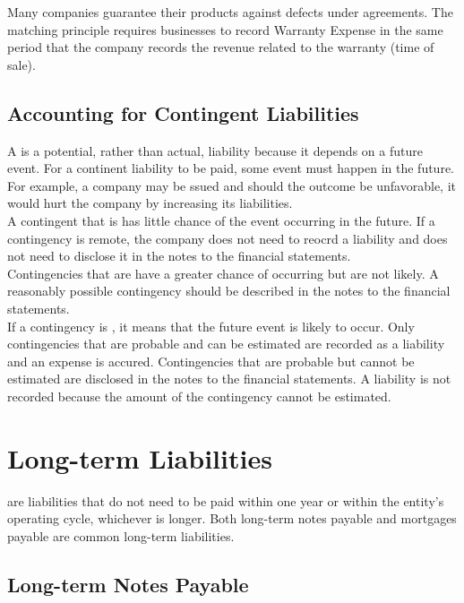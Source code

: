 \documentclass{article}
\begin{document}
Many companies guarantee their products against defects under  agreements. The matching principle requires businesses to record Warranty Expense in the same period that the company records the revenue related to the warranty (time of sale). 

\subsection{Accounting for Contingent Liabilities}

A  is a potential, rather than actual, liability because it depends on a future event. For a continent liability to be paid, some event must happen in the future. For example, a company may be ssued and should the outcome be unfavorable, it would hurt the company by increasing its liabilities. \\ 

A contingent that is  has little chance of the event occurring in the future. If a contingency is remote, the company does not need to reocrd a liability and does not need to disclose it in the notes to the financial statements. \\ 

Contingencies that are  have a greater chance of occurring but are not likely. A reasonably possible contingency should be described in the notes to the financial statements. \\ 

If a contingency is , it means that the future event is likely to occur. Only contingencies that are probable and can be estimated are recorded as a liability and an expense is accured. Contingencies that are probable but cannot be estimated are disclosed in the notes to the financial statements. A liability is not recorded because the amount of the contingency cannot be estimated. 

\section{Long-term Liabilities}

 are liabilities that do not need to be paid within one year or within the entity's operating cycle, whichever is longer. Both long-term notes payable and mortgages payable are common long-term liabilities. 

\subsection{Long-term Notes Payable}
\end{document}
